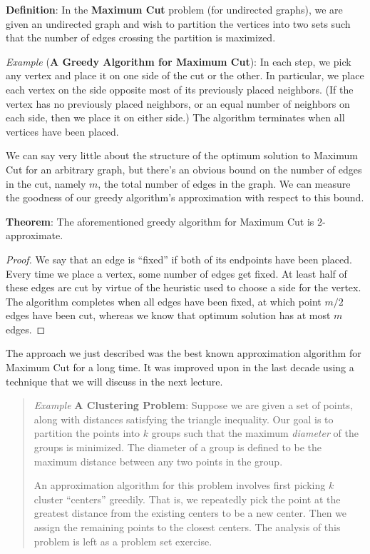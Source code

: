 \documentclass{article}
\begin{document}
\textbf{Definition}:
In the \textbf{Maximum Cut} problem (for undirected graphs), we are
given an undirected graph and wish to partition the vertices into two
sets such that the number of edges crossing the partition is maximized.

\emph{Example}
(\textbf{A Greedy Algorithm for Maximum Cut}):
In each step, we pick any vertex and place it on one side of the cut
or the other.  In particular, we place each vertex on the side
opposite most of its previously placed neighbors.  (If the vertex has
no previously placed neighbors, or an equal number of neighbors on
each side, then we place it on either side.)  The algorithm terminates
when all vertices have been placed.

We can say very little about the structure of the optimum solution to
Maximum Cut for an arbitrary graph, but there's an obvious bound on
the number of edges in the cut, namely $m$, the total number of edges
in the graph.  We can measure the goodness of our greedy algorithm's
approximation with respect to this bound.

\textbf{Theorem}:
The aforementioned greedy algorithm for Maximum Cut is 2-approximate.

\begin{proof}
We say that an edge is ``fixed'' if both of its endpoints have been
placed.  Every time we place a vertex, some number of edges get
fixed.  At least half of these edges are cut by virtue of the
heuristic used to choose a side for the vertex.  The algorithm
completes when all edges have been fixed, at which point $m/2$ edges
have been cut, whereas we know that optimum solution has at most $m$
edges.
\end{proof}

The approach we just described was the best known approximation
algorithm for Maximum Cut for a long time.  It was improved upon in
the last decade using a technique that we will discuss in the next
lecture.

\begin{quote}
\emph{Example}
\textbf{A Clustering Problem}: Suppose we are given a set of points,
along with distances satisfying the triangle inequality.  Our goal is
to partition the points into $k$ groups such that the maximum
\textit{diameter} of the groups is minimized.  The diameter of a group
is defined to be the maximum distance between any two points in the
group.

An approximation algorithm for this problem involves first picking $k$
cluster ``centers'' greedily.  That is, we repeatedly pick the point
at the greatest distance from the existing centers to be a new
center.  Then we assign the remaining points to the closest centers.
The analysis of this problem is left as a problem set exercise.
\end{quote}
\end{document}
